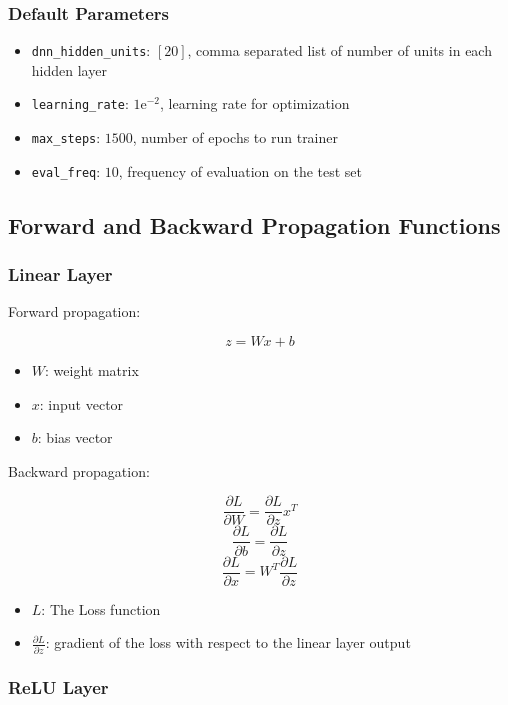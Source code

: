 \documentclass{article}
\begin{document}
\subsubsection{Default Parameters}

\begin{itemize}
    \item \texttt{dnn\_hidden\_units}: $[20]$, comma separated list of number of units in each hidden layer
    \item \texttt{learning\_rate}: $1\mathrm{e}^{-2}$, learning rate for optimization
    \item \texttt{max\_steps}: $1500$, number of epochs to run trainer
    \item \texttt{eval\_freq}: $10$, frequency of evaluation on the test set
\end{itemize}

\subsection{Forward and Backward Propagation Functions}

\subsubsection{Linear Layer}

Forward propagation:

$$
z = Wx + b
$$

\begin{itemize}
    \item $W$: weight matrix
    \item $x$: input vector
    \item $b$: bias vector
\end{itemize}

Backward propagation:

$$ \frac{\partial L}{\partial W} = \frac{\partial L}{\partial z} x^T $$
$$ \frac{\partial L}{\partial b} = \frac{\partial L}{\partial z} $$
$$ \frac{\partial L}{\partial x} = W^T \frac{\partial L}{\partial z} $$


\begin{itemize}
    \item $L$: The Loss function
    \item $\frac{\partial L}{\partial z}$: gradient of the loss with respect to the linear layer output
\end{itemize}


\subsubsection{ReLU Layer}
\end{document}
